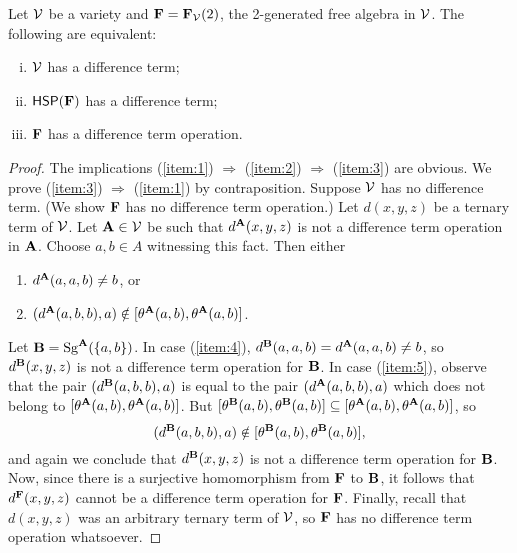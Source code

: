 \begin{thm}
  \label{thm:F}
Let $\mathcal{V}$ be a variety and $\mathbf{F} = \mathbf{F}_{\mathcal{V}}(2)$, the 2-generated
free algebra in $\mathcal{V}$. The following are equivalent:
\begin{enumerate}[(i)]
\item \label{item:1}
  $\mathcal{V}$ has a difference term;
\item \label{item:2}
  $\mathsf{H} \mathsf{S} \mathsf{P} (\mathbf{F})$ has a difference term;
\item \label{item:3}
  $\mathbf{F}$ has a difference term operation.
\end{enumerate}
\end{thm}
\begin{proof}
  The implications
  (\ref{item:1}) $\Rightarrow$  (\ref{item:2}) $\Rightarrow$  (\ref{item:3}) are
  obvious. We prove
  (\ref{item:3}) $\Rightarrow$  (\ref{item:1}) by contraposition.
  Suppose $\mathcal{V}$ has no difference term. (We show $\mathbf{F}$ has no difference term
  operation.)
  Let $d(x,y,z)$ be a ternary term of $\mathcal{V}$.  Let $\mathbf{A}\in \mathcal{V}$ be such that
  $d^{\mathbf{A}}(x,y,z)$ is not a difference term operation in $\mathbf{A}$.
  Choose $a, b \in A$ witnessing this fact.  Then either
  \begin{enumerate}
  \item\label{item:4} $d^{\mathbf{A}}(a,a,b) \neq b$, or
  \item\label{item:5} $(d^{\mathbf{A}}(a,b,b), a) \notin [\theta^{\mathbf{A}} (a, b), \theta^{\mathbf{A}} (a,b)]$.
  \end{enumerate}
  Let $\mathbf{B} = \operatorname{Sg}^{\mathbf{A}} (\{a, b\})$.  In case
  (\ref{item:4}), 
  $d^{\mathbf{B}}(a,a,b) = d^{\mathbf{A}}(a,a,b) \neq b$, so $d^{\mathbf{B}}(x,y,z)$ is not a difference
  term operation for $\mathbf{B}$.
  In case (\ref{item:5}), observe that
  the pair $(d^{\mathbf{B}}(a,b,b), a)$ is equal to the pair $(d^{\mathbf{A}}(a,b,b), a)$ which
  does not belong to $[\theta^{\mathbf{A}} (a, b), \theta^{\mathbf{A}} (a,b)]$.
  But 
  $[\theta^{\mathbf{B}} (a, b), \theta^{\mathbf{B}} (a,b)] \subseteq[\theta^{\mathbf{A}} (a, b), \theta^{\mathbf{A}} (a,b)]$, so
  \[(d^{\mathbf{B}}(a,b,b), a) \notin [\theta^{\mathbf{B}} (a, b), \theta^{\mathbf{B}} (a,b)],\]
  and again we conclude that $d^{\mathbf{B}}(x,y,z)$ is not a difference term operation for $\mathbf{B}$.
  Now, since there is a surjective homomorphism from $\mathbf{F}$ to $\mathbf{B}$,
  it follows that $d^{\mathbf{F}}(x,y,z)$ cannot be a difference term operation for $\mathbf{F}$.
  Finally, recall that $d(x,y,z)$ was an arbitrary ternary term of $\mathcal{V}$, so
  $\mathbf{F}$ has no difference term operation whatsoever.
\end{proof}




